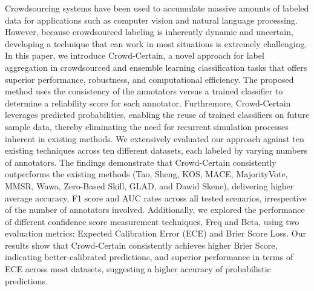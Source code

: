 Crowdsourcing systems have been used to accumulate massive amounts of labeled data for applications such as computer vision and natural language processing.
However, because crowdsourced labeling is inherently dynamic and uncertain, developing a technique that can work in most situations is extremely challenging.
In this paper, we introduce Crowd-Certain, a novel approach for label aggregation in crowdsourced and ensemble learning classification tasks that offers superior performance, robustness, and computational efficiency.
The proposed method uses the consistency of the annotators versus a trained classifier to determine a reliability score for each annotator.
Furthremore, Crowd-Certain leverages predicted probabilities, enabling the reuse of trained classifiers on future sample data, thereby eliminating the need for recurrent simulation processes inherent in existing methods.
We extensively evaluated our approach against ten existing techniques across ten different datasets, each labeled by varying numbers of annotators.
The findings demonstrate that Crowd-Certain consistently outperforms the existing methods (Tao, Sheng, KOS, MACE, MajorityVote, MMSR, Wawa, Zero-Based Skill, GLAD, and Dawid Skene), delivering higher average accuracy, F1 score and AUC rates across all tested scenarios, irrespective of the number of annotators involved.
Additionally, we explored the performance of different confidence score measurement techniques, Freq and Beta, using two evaluation metrics: Expected Calibration Error (ECE) and Brier Score Loss.
Our results show that Crowd-Certain consistently achieves higher Brier Score, indicating better-calibrated predictions, and superior performance in terms of ECE across most datasets, suggesting a higher accuracy of probabilistic predictions.

